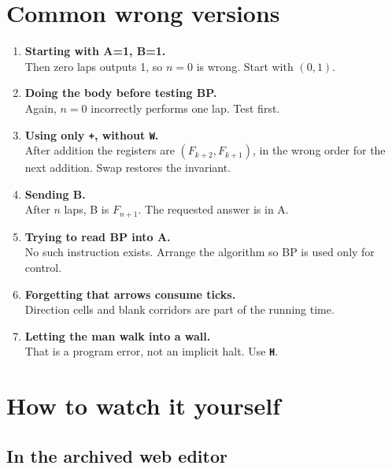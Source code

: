 \documentclass[11pt,a4paper]{article}
\newcommand{\op}[1]{\texttt{\bfseries #1}}
\newcommand{\Fib}[1]{F_{#1}}
\begin{document}
\section{Common wrong versions}

\begin{enumerate}
  \item \textbf{Starting with A=1, B=1.}\\
        Then zero laps outputs 1, so \(n=0\) is wrong. Start with \((0,1)\).

  \item \textbf{Doing the body before testing BP.}\\
        Again, \(n=0\) incorrectly performs one lap. Test first.

  \item \textbf{Using only \op{+}, without \op{W}.}\\
        After addition the registers are
        \((\Fib{k+2},\Fib{k+1})\), in the wrong order for the next addition.
        Swap restores the invariant.

  \item \textbf{Sending B.}\\
        After \(n\) laps, B is \(\Fib{n+1}\). The requested answer is in A.

  \item \textbf{Trying to read BP into A.}\\
        No such instruction exists. Arrange the algorithm so BP is used only
        for control.

  \item \textbf{Forgetting that arrows consume ticks.}\\
        Direction cells and blank corridors are part of the running time.

  \item \textbf{Letting the man walk into a wall.}\\
        That is a program error, not an implicit halt. Use \op{H}.
\end{enumerate}

\clearpage
\section{How to watch it yourself}

\subsection{In the archived web editor}
\end{document}
